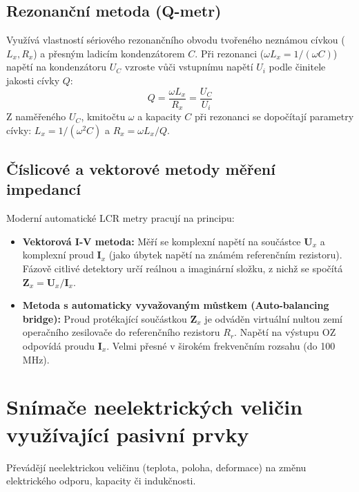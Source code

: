 \subsection{Rezonanční metoda (Q-metr)}
Využívá vlastností sériového rezonančního obvodu tvořeného neznámou cívkou ($L_x, R_x$) a přesným ladicím kondenzátorem $C$.
Při rezonanci ($\omega L_x = 1/(\omega C)$) napětí na kondenzátoru $U_C$ vzroste vůči vstupnímu napětí $U_i$ podle činitele jakosti cívky $Q$:
\[ Q = \frac{\omega L_x}{R_x} = \frac{U_C}{U_i} \]
Z naměřeného $U_C$, kmitočtu $\omega$ a kapacity $C$ při rezonanci se dopočítají parametry cívky: $L_x = 1/(\omega^2 C)$ a $R_x = \omega L_x / Q$.

\subsection{Číslicové a vektorové metody měření impedancí}
Moderní automatické LCR metry pracují na principu:
\begin{itemize}
    \item \textbf{Vektorová I-V metoda:} Měří se komplexní napětí na součástce $\mathbf{U}_x$ a komplexní proud $\mathbf{I}_x$ (jako úbytek napětí na známém referenčním rezistoru). Fázově citlivé detektory určí reálnou a imaginární složku, z nichž se spočítá $\mathbf{Z}_x = \mathbf{U}_x/\mathbf{I}_x$.
    \item \textbf{Metoda s automaticky vyvažovaným můstkem (Auto-balancing bridge):} Proud protékající součástkou $\mathbf{Z}_x$ je odváděn virtuální nultou zemí operačního zesilovače do referenčního rezistoru $R_r$. Napětí na výstupu OZ odpovídá proudu $\mathbf{I}_x$. Velmi přesné v širokém frekvenčním rozsahu (do 100 MHz).
\end{itemize}

\section{Snímače neelektrických veličin využívající pasivní prvky}
Převádějí neelektrickou veličinu (teplota, poloha, deformace) na změnu elektrického odporu, kapacity či indukčnosti.

